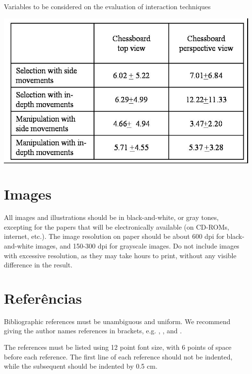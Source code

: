 \documentclass[12pt]{article}
\begin{document}
\begin{table}[ht]
\centering
\caption{Variables to be considered on the evaluation of interaction
  techniques}
\label{tab:exTable1}
\includegraphics[width=.7\textwidth]{table.jpg}
\end{table}

\section{Images}

All images and illustrations should be in black-and-white, or gray tones,
excepting for the papers that will be electronically available (on CD-ROMs,
internet, etc.). The image resolution on paper should be about 600 dpi for
black-and-white images, and 150-300 dpi for grayscale images.  Do not include
images with excessive resolution, as they may take hours to print, without any
visible difference in the result. 

\section{Referências}

\cite{araujo:2015}

Bibliographic references must be unambiguous and uniform.  We recommend giving
the author names references in brackets, e.g. \cite{knuth:84},
\cite{boulic:91}, and \cite{smith:99}.

The references must be listed using 12 point font size, with 6 points of space
before each reference. The first line of each reference should not be
indented, while the subsequent should be indented by 0.5 cm.




\end{document}
